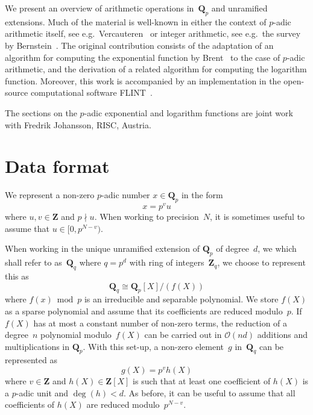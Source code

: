 We present an overview of arithmetic operations in~$\mathbf{Q}_p$ 
and unramified extensions.  Much of the material is well-known in 
either the context of $p$-adic arithmetic itself, see e.g.\ 
Vercauteren~\citep[\S 12]{HEHCC2005} or integer arithmetic, 
see e.g.\ the survey by Bernstein~\citep{Bernstein2008}. 
The original contribution consists of the adaptation of an algorithm 
for computing the exponential function by Brent~\citep{Brent1976} 
to the case of $p$-adic arithmetic, and the derivation of a related 
algorithm for computing the logarithm function.  Moreover, this 
work is accompanied by an implementation in the open-source computational 
software {\sc FLINT}~\citep{FLINT}.

The sections on the $p$-adic exponential and logarithm functions 
are joint work with Fredrik Johansson, RISC, Austria.

\section{Data format}

We represent a non-zero $p$-adic number $x \in \mathbf{Q}_p$ in the form 
\begin{equation}
x = p^v u
\end{equation}
where $u, v \in \mathbf{Z}$ and $p \nmid u$.  When working to precision~$N$, 
it is sometimes useful to assume that $u \in [0,p^{N-v})$.

When working in the unique unramified extension of $\mathbf{Q}_p$ of 
degree~$d$, we which shall refer to as~$\mathbf{Q}_q$ where $q = p^d$ 
with ring of integers~$\mathbf{Z}_q$, we choose to represent this as 
\begin{equation}
\mathbf{Q}_q \cong \mathbf{Q}_p[X] / (f(X))
\end{equation}
where $f(x) \bmod p$ is an irreducible and separable polynomial.  We store 
$f(X)$ as a sparse polynomial and assume that its coefficients are 
reduced modulo~$p$.  If $f(X)$ has at most a constant number of non-zero 
terms, the reduction of a degree~$n$ polynomial modulo~$f(X)$ can be carried 
out in $\mathcal{O}(nd)$ additions and multiplications in $\mathbf{Q}_p$.  
With this set-up, a non-zero element~$g$ in~$\mathbf{Q}_q$ can be represented 
as 
\begin{equation}
g(X) = p^v h(X)
\end{equation}
where $v \in \mathbf{Z}$ and $h(X) \in \mathbf{Z}[X]$ is such that at least 
one coefficient of $h(X)$ is a $p$-adic unit and $\deg(h) < d$.  As before, 
it can be useful to assume that all coefficients of $h(X)$ are reduced 
modulo~$p^{N-v}$.

